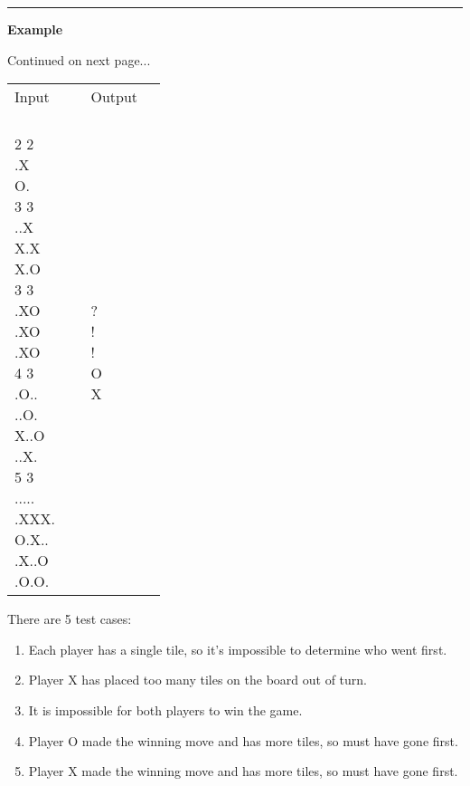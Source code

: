 \vspace{8pt}
\hrule

\textbf{Example}

Continued on next page...

\newpage

\begin{table}[h]
    \centering
    \begin{tabular}{|p{0.4\linewidth}|p{0.4\linewidth}|}
        \hline
        Input & Output \\
        \hline
        {\ttfamily 
        5 \newline 
        2 2 \newline
        .X \newline O. \newline
        3 3 \newline
        ..X \newline X.X \newline X.O \newline
        3 3 \newline
        .XO \newline .XO \newline .XO \newline
        4 3 \newline 
        .O.. \newline ..O. \newline X..O \newline ..X. \newline
        5 3 \newline
        ..... \newline .XXX. \newline O.X.. \newline .X..O \newline .O.O.
        } &  
        {\ttfamily ? \newline ! \newline ! \newline O \newline X} \\
        \hline
    \end{tabular}
\end{table}

There are 5 test cases:

\begin{enumerate}
    \item Each player has a single tile, so it's impossible to determine who went first.
    \item Player X has placed too many tiles on the board out of turn.
    \item It is impossible for both players to win the game.
    \item Player O made the winning move and has more tiles, so must have gone first.
    \item Player X made the winning move and has more tiles, so must have gone first.
\end{enumerate}